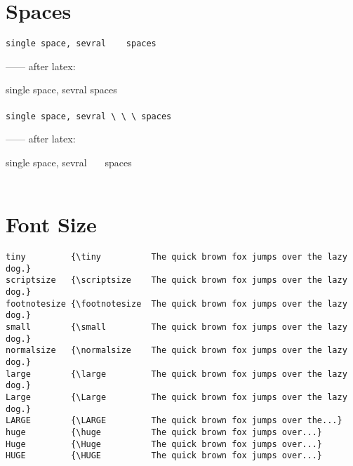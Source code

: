 \documentclass[a4paper,12pt]{article}
\begin{document}
\section*{Spaces}

\verb|single space, sevral    spaces| 

------ after latex: 

single space, sevral    spaces \\ \\


\verb|single space, sevral \ \ \ spaces| 

------ after latex: 

single space, sevral \ \ \ spaces \\ \\

\section*{Font Size}

\begin{verbatim}
tiny         {\tiny          The quick brown fox jumps over the lazy dog.}
scriptsize   {\scriptsize    The quick brown fox jumps over the lazy dog.}
footnotesize {\footnotesize  The quick brown fox jumps over the lazy dog.}
small        {\small         The quick brown fox jumps over the lazy dog.}
normalsize   {\normalsize    The quick brown fox jumps over the lazy dog.}
large        {\large         The quick brown fox jumps over the lazy dog.}
Large        {\Large         The quick brown fox jumps over the lazy dog.}
LARGE        {\LARGE         The quick brown fox jumps over the...}       
huge         {\huge          The quick brown fox jumps over...}           
Huge         {\Huge          The quick brown fox jumps over...}           
HUGE         {\HUGE          The quick brown fox jumps over...}           
\end{verbatim}
\end{document}
